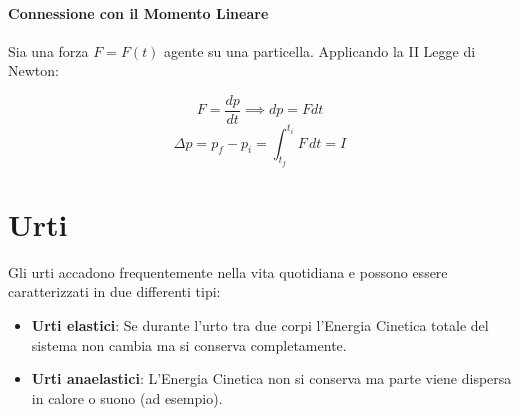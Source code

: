         \paragraph{Connessione con il Momento Lineare} Sia una forza $F = F(t)$
        agente su una particella. Applicando la II Legge di Newton:

        \begin{equation*}
            F = \frac{dp}{dt} \implies dp = F dt
        \end{equation*}
        \begin{equation*}
            \Delta p = p_f - p_i = \int_{t_f}^{t_i} F \,dt = I 
        \end{equation*}
    
    \section{Urti} Gli urti accadono frequentemente nella vita quotidiana e 
    possono essere caratterizzati in due differenti tipi:
    \begin{itemize}
        \item \textbf{Urti elastici}: Se durante l'urto tra due corpi l'Energia 
        Cinetica totale del sistema non cambia ma si conserva completamente.
        \item \textbf{Urti anaelastici}: L'Energia Cinetica non si conserva ma 
        parte viene dispersa in calore o suono (ad esempio).
    \end{itemize} 

